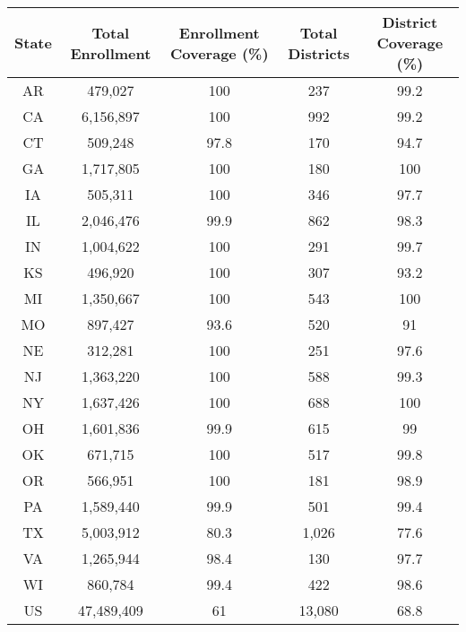 
\begin{tabular}{ccccc}
\toprule
State & Total Enrollment & Enrollment Coverage (\%) & Total Districts & District Coverage (\%)\\
\midrule
AR & 479,027 & 100 & 237 & 99.2\\
CA & 6,156,897 & 100 & 992 & 99.2\\
CT & 509,248 & 97.8 & 170 & 94.7\\
GA & 1,717,805 & 100 & 180 & 100\\
IA & 505,311 & 100 & 346 & 97.7\\
\addlinespace
IL & 2,046,476 & 99.9 & 862 & 98.3\\
IN & 1,004,622 & 100 & 291 & 99.7\\
KS & 496,920 & 100 & 307 & 93.2\\
MI & 1,350,667 & 100 & 543 & 100\\
MO & 897,427 & 93.6 & 520 & 91\\
\addlinespace
NE & 312,281 & 100 & 251 & 97.6\\
NJ & 1,363,220 & 100 & 588 & 99.3\\
NY & 1,637,426 & 100 & 688 & 100\\
OH & 1,601,836 & 99.9 & 615 & 99\\
OK & 671,715 & 100 & 517 & 99.8\\
\addlinespace
OR & 566,951 & 100 & 181 & 98.9\\
PA & 1,589,440 & 99.9 & 501 & 99.4\\
TX & 5,003,912 & 80.3 & 1,026 & 77.6\\
VA & 1,265,944 & 98.4 & 130 & 97.7\\
WI & 860,784 & 99.4 & 422 & 98.6\\
\addlinespace
US & 47,489,409 & 61 & 13,080 & 68.8\\
\bottomrule
\end{tabular}

